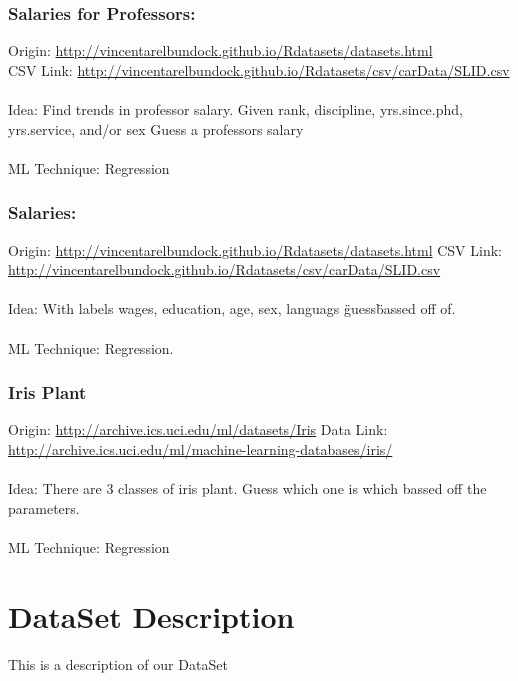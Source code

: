 \documentclass[14pt, letterpaper]{extarticle}
\begin{document}
            \subsubsection{Salaries for Professors:}
            Origin: \url{http://vincentarelbundock.github.io/Rdatasets/datasets.html} \\
            CSV Link:  \url{http://vincentarelbundock.github.io/Rdatasets/csv/carData/SLID.csv}
            \\~\\
            Idea: Find trends in professor salary. Given rank, discipline, yrs.since.phd, yrs.service, and/or sex
            Guess a professors salary
            \\~\\
            ML Technique: Regression
        
            \subsubsection{Salaries: }
            Origin: \url{http://vincentarelbundock.github.io/Rdatasets/datasets.html}
            CSV Link: \url{http://vincentarelbundock.github.io/Rdatasets/csv/carData/SLID.csv}
            \\~\\
            Idea: With labels wages, education, age, sex, languags \"guess\" bassed off of.
            \\~\\
            ML Technique: Regression.

            \subsubsection{Iris Plant}
            Origin: \url{http://archive.ics.uci.edu/ml/datasets/Iris}
            Data Link: \url{http://archive.ics.uci.edu/ml/machine-learning-databases/iris/}
            \\~\\
            Idea: There are 3 classes of iris plant. Guess which one is which bassed off the parameters.
            \\~\\
            ML Technique: Regression 


        \section{DataSet Description}
        This is a description of our DataSet
\end{document}
